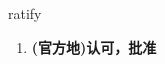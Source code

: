 
\begin{frame}
{\huge ratify}
\begin{center}
\begin{enumerate}\Large
  \item \textbf{(官方地)认可，批准}
\end{enumerate}
\end{center}
\end{frame}
